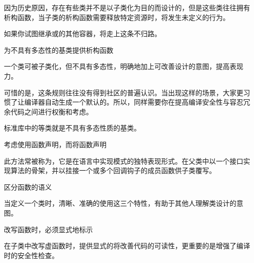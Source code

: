 \begin{content}
因为历史原因，存在有些类并不是以子类化为目的而设计的，但是这些类往往拥有析构函数，当子类的析构函数需要释放特定资源时，将发生未定义的行为。

如果你试图继承或的其他容器，将走上这条不归路。

\begin{regulation}
为不具有多态性的基类提供析构函数
\end{regulation}

一个类可被子类化，但不具有多态性，明确地加上可改善设计的意图，提高表现力。

可惜的是，这条规则往往没有得到社区的普遍认识。当出现这样的场景，大家更习惯了让编译器自动生成一个默认的。所以，同样需要你在提高编译安全性与容忍冗余代码之间进行权衡和考虑。

标准库中的等类就是不具有多态性质的基类。

\begin{regulation}
考虑使用函数声明，而将函数声明
\end{regulation}

此方法常被称为，它是在\cpp{}语言中实现模式的独特表现形式。在父类中以一个接口实现算法的骨架，并以挂接一个或多个回调钩子的成员函数供子类覆写。

\begin{regulation}
区分函数的语义
\end{regulation}

当定义一个类时，清晰、准确的使用这三个特性，有助于其他人理解类设计的意图。

\begin{enum}
\end{enum}

\begin{regulation}
改写函数时，必须显式地标示
\end{regulation}

在子类中改写虚函数时，提供显式的将改善代码的可读性，更重要的是增强了编译时的安全性检查。


\end{content}
